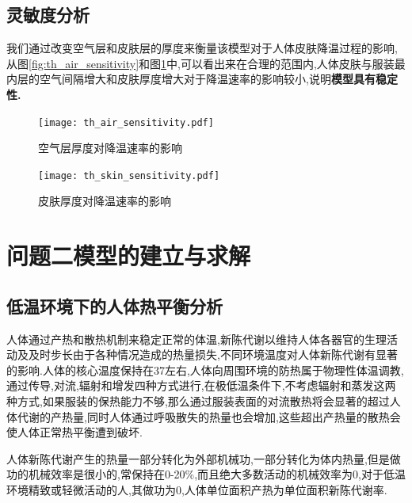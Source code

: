\documentclass{whutmod}
\begin{document}
\subsection{灵敏度分析}
我们通过改变空气层和皮肤层的厚度来衡量该模型对于人体皮肤降温过程的影响,从图\ref{fig:th_air_sensitivity}和图\ref{fig:th_skin_sensitivity}中,可以看出来在合理的范围内,人体皮肤与服装最内层的空气间隔增大和皮肤厚度增大对于降温速率的影响较小,说明\textbf{模型具有稳定性.}
\begin{figure}[!h]
	\begin{minipage}[t]{0.48\textwidth}
		\centering
	\texttt{[image: th\_air\_sensitivity.pdf]}
		\caption{空气层厚度对降温速率的影响}
		\label{fig:th_air_sensitivity}
	\end{minipage}
	\begin{minipage}[t]{0.48\textwidth}
		\centering
	\texttt{[image: th\_skin\_sensitivity.pdf]}
\caption{皮肤厚度对降温速率的影响}
\label{fig:th_skin_sensitivity}
	\end{minipage}
\end{figure}
%

\section{问题二模型的建立与求解}
\subsection{低温环境下的人体热平衡分析}
人体通过产热和散热机制来稳定正常的体温,新陈代谢以维持人体各器官的生理活动及及时步长由于各种情况造成的热量损失,不同环境温度对人体新陈代谢有显著的影响.人体的核心温度保持在37\textcelsius 左右,人体向周围环境的防热属于物理性体温调教,通过传导,对流,辐射和增发四种方式进行,在极低温条件下,不考虑辐射和蒸发这两种方式,如果服装的保热能力不够,那么通过服装表面的对流散热将会显著的超过人体代谢的产热量,同时人体通过呼吸散失的热量也会增加,这些超出产热量的散热会使人体正常热平衡遭到破坏.

人体新陈代谢产生的热量一部分转化为外部机械功,一部分转化为体内热量,但是做功的机械效率是很小的,常保持在0-20\%,而且绝大多数活动的机械效率为0,对于低温环境精致或轻微活动的人,其做功为0,人体单位面积产热为单位面积新陈代谢率.
\end{document}

